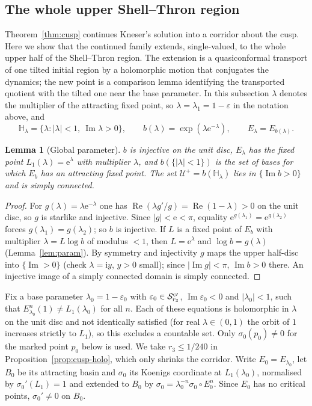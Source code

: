 \documentclass[11pt]{amsart}
\newtheorem{lemma}[theorem]{Lemma}
\theoremstyle{definition}
\newcommand{\eee}{\mathrm{e}}
\newcommand{\ii}{\mathrm{i}}
\begin{document}
\subsection{The whole upper Shell--Thron region}\label{sec:global}
Theorem~\ref{thm:cusp} continues Kneser's solution into a corridor about
the cusp.  Here we show that the continued family extends, single-valued,
to the whole upper half of the Shell--Thron region.  The extension is a
quasiconformal transport of one tilted initial region by a holomorphic
motion that conjugates the dynamics; the new point is a comparison lemma
identifying the transported quotient with the tilted one near the base
parameter.  In this subsection $\lambda$ denotes the multiplier of the
attracting fixed point, so $\lambda=\lambda_1=1-\varepsilon$ in the notation above, and
\[
 \mathbb H_\lambda=\{\lambda:|\lambda|<1,\ \operatorname{Im}\lambda>0\},\qquad
 b(\lambda)=\exp(\lambda\eee^{-\lambda}),\qquad E_\lambda=E_{b(\lambda)} .
\]

\begin{lemma}[Global parameter]\label{lem:global-param}
$b$ is injective on the unit disc, $E_\lambda$ has the fixed point
$L_1(\lambda)=\eee^\lambda$ with multiplier $\lambda$, and $b(\{|\lambda|<1\})$ is the
set of bases for which $E_b$ has an attracting fixed point.  The set
$\mathcal U^+=b(\mathbb H_\lambda)$ lies in $\{\operatorname{Im}b>0\}$ and is simply
connected.
\end{lemma}

\begin{proof}
For $g(\lambda)=\lambda\eee^{-\lambda}$ one has $\operatorname{Re}(\lambda g'/g)=\operatorname{Re}(1-\lambda)>0$ on the
unit disc, so $g$ is starlike and injective.  Since $|g|<\eee<\pi$, equality
$\eee^{g(\lambda_1)}=\eee^{g(\lambda_2)}$ forces $g(\lambda_1)=g(\lambda_2)$; so $b$ is injective.  If
$L$ is a fixed point of $E_b$ with multiplier $\lambda=L\log b$ of modulus $<1$,
then $L=\eee^\lambda$ and $\log b=g(\lambda)$ (Lemma~\ref{lem:param}).  By symmetry and
injectivity $g$ maps the upper half-disc into $\{\operatorname{Im}>0\}$ (check
$\lambda=\ii y$, $y>0$ small); since $|\operatorname{Im}g|<\pi$, $\operatorname{Im}b>0$ there.  An injective
image of a simply connected domain is simply connected.
\end{proof}

Fix a base parameter $\lambda_0=1-\varepsilon_0$ with $\varepsilon_0\in\mathcal S^{\rm c\prime}_{r_3}$,
$\operatorname{Im}\varepsilon_0<0$ and $|\lambda_0|<1$, such that $E_{\lambda_0}^n(1)\ne L_1(\lambda_0)$ for all $n$.  Each of these
equations is holomorphic in $\lambda$ on the unit disc and not identically
satisfied (for real $\lambda\in(0,1)$ the orbit of $1$ increases strictly to $L_1$), so
this excludes a countable set.  Only $\sigma_0(p_0)\ne0$ for the marked point
$p_0$ below is used.  We take $r_3\le1/240$ in Proposition~\ref{prop:cusp-holo}, which
only shrinks the corridor.  Write $E_0=E_{\lambda_0}$, let $B_0$ be its attracting basin and
$\sigma_0$ its Koenigs coordinate at $L_1(\lambda_0)$, normalised by $\sigma_0'(L_1)=1$ and
extended to $B_0$ by $\sigma_0=\lambda_0^{-n}\sigma_0\circ E_0^n$.  Since $E_0$ has no critical
points, $\sigma_0'\ne0$ on $B_0$.
\end{document}
